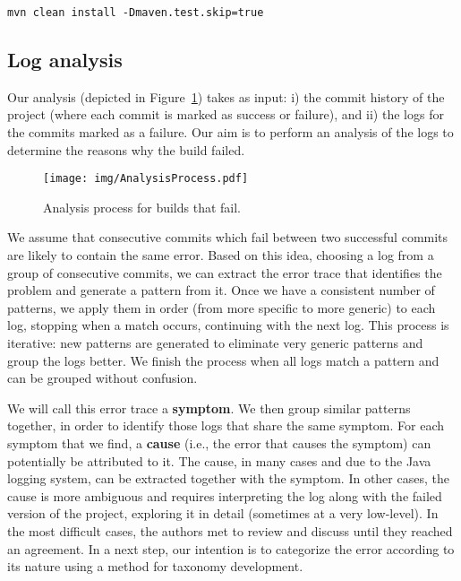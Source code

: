 

\begin{lstlisting}[caption={Example of a Maven build command},captionpos=b, label={listing:mvnscrpt}]
                      mvn clean install -Dmaven.test.skip=true
\end{lstlisting}


\subsection{Log analysis} 
\label{sssec:logAnalysis}

Our analysis (depicted in Figure~\ref{fig:AnalysisProcess}) takes as input:
   i) the commit history of the project (where each commit is marked as success or failure), and
   ii) the logs for the commits marked as a failure.
Our aim is to perform an analysis of the logs to determine the reasons why the build failed.

\begin{figure}[h]
	\centering    
	\texttt{[image: img/AnalysisProcess.pdf]}
	\caption{Analysis process for builds that fail.}
	\label{fig:AnalysisProcess}
\end{figure}

We assume that consecutive commits which fail between two successful commits are likely to contain the same error.
Based on this idea, choosing a log from a group of consecutive commits, we can extract the error trace that identifies the problem and generate a pattern from it.
Once we have a consistent number of patterns, we apply them in order (from more specific to more generic) to each log, stopping when a match occurs, continuing with the next log.
This process is iterative: new patterns are generated to eliminate very generic patterns and group the logs better.
We finish the process when all logs match a pattern and can be grouped without confusion.

We will call this error trace a \textbf{symptom}.
We then group similar patterns together, in order to identify those logs that share the same symptom.
For each symptom that we find, a \textbf{cause} (i.e., the error that causes the symptom) can potentially be attributed to it.
The cause, in many cases and due to the Java logging system, can be extracted together with the symptom.
In other cases, the cause is more ambiguous and requires interpreting the log along with the failed version of the project, exploring it in detail (sometimes at a very low-level).
In the most difficult cases, the authors met to review and discuss until they reached an agreement.
In a next step, our intention is to categorize the error according to its nature using a method for taxonomy development.


